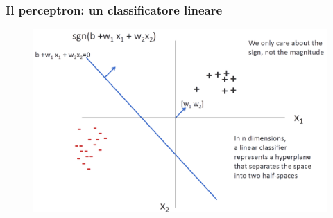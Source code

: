 \begin{frame}

	\frametitle{Il perceptron: un classificatore lineare}
	
		\begin{figure}[!htbp]
			\centering
			\includegraphics[width=1.0\linewidth]{images/supervised/perceptron/linear_classifier_1.png}
		\end{figure}

\end{frame}


